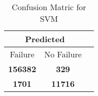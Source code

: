 \begin{table}[] 
\caption{Confusion Matric for SVM} 
\label{Table: Prediction Accuracy-LOFSVMSVMEKF-ignoreReflection-Reflection} 
\centering 
\begin{tabular} 
 {@{}ccc@{}} 
\toprule 
\multicolumn{2}{c}{\textbf{Predicted}}
 \\ \midrule 
\multicolumn{1}{|c|}{Failure} & 
\multicolumn{1}{c|}{No Failure}
 \\ \midrule 
\multicolumn{1}{|c|}{\color{green}\textbf{156382}} & 
\multicolumn{1}{c|}{\color{red}\textbf{329}}
 \\ \midrule 
\multicolumn{1}{|c|}{\color{red}\textbf{1701}} & 
\multicolumn{1}{c|}{\color{green}\textbf{11716}}
 \\ \bottomrule 
\end{tabular} 
\end{table} 
